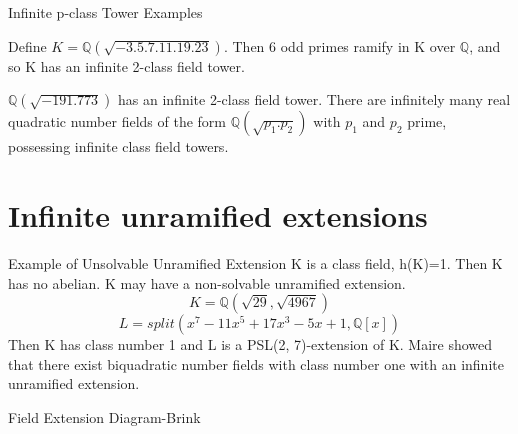 \documentclass[10pt]{beamer}
\theoremstyle{plain} %
\begin{document}
\begin{frame}{Infinite p-class Tower Examples}
\begin{example}
    Define $K=\mathbb{Q}(\sqrt{-3.5.7.11.19.23})$. Then 6 odd primes ramify in K over $\mathbb{Q}$, and so K has an infinite 2-class field tower. 
\end{example}
\begin{example}[Schoof]
$\mathbb{Q}(\sqrt{-191.773})$ has an infinite 2-class field tower. There are infinitely many real quadratic number fields of the form $\mathbb{Q}(\sqrt{p_1.p_2})$ with $p_1$ and $p_2$ prime, possessing infinite class field towers. 
\end{example}
\end{frame}
\section{Infinite unramified extensions}
\begin{frame}{Example of Unsolvable Unramified Extension}
K is a class field, h(K)=1. Then K has no abelian.
K may have a non-solvable unramified extension.
\begin{equation}
   K=\mathbb{Q}(\sqrt{29},\sqrt{4967}) 
\end{equation}
\begin{equation}
   L=split(x^7 - 11x^5 + 17x^3 - 5x + 1,\mathbb{Q}[x])
\end{equation}
Then K has class number 1 and L is a PSL(2, 7)-extension of K.
Maire showed that there exist biquadratic number fields with class number one with an infinite unramified extension.
\end{frame}

\begin{frame}{Field Extension Diagram-Brink}
  \begin{center}
\end{center}  
\end{frame}
\end{document}
